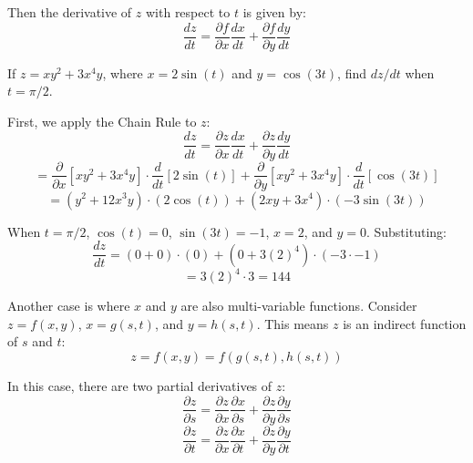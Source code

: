 Then the derivative of $z$ with respect to $t$ is given by:
$$\frac{dz}{dt} = \frac{\partial f}{\partial x} \frac{dx}{dt} + \frac{
\partial f}{\partial y} \frac{dy}{dt}$$

\begin{Worked}
\begin{Problem}
If $z = xy^2 + 3x^4y$, where $x = 2\sin{\left( t \right)}$ 
and $y = \cos{ \left(3t \right)}$, find $dz/dt$ when $t = \pi/2$. 
\end{Problem}
\begin{Solution}
First, we apply the Chain Rule to $z$:
$$\frac{dz}{dt} = \frac{\partial z}{\partial x} \frac{dx}{dt} + \frac{\partial 
z}{\partial y} \frac{dy}{dt}$$
$$= \frac{\partial}{\partial x} \left[ xy^2 + 3x^4y \right] \cdot \frac{d}{dt} 
\left[ 2\sin{ \left( t \right)} \right] + \frac{\partial}{\partial y} \left[ 
xy^2 + 3x^4y \right] \cdot \frac{d}{dt} \left[ \cos{ \left( 3t \right)} 
\right]$$
$$= \left( y^2 + 12x^3y \right) \cdot \left( 2\cos{ \left( t \right)} \right) 
+ \left( 2xy + 3x^4 \right) \cdot \left( -3\sin{ \left( 3t \right) } \right)$$

When $t = \pi/2$, $\cos{\left( t \right)} = 0$, $\sin{ \left( 3t \right)} = 
-1$, $x = 2$, and $y = 0$. Substituting:
$$\frac{dz}{dt} = \left( 0 + 0 \right) \cdot \left( 0 \right) + \left( 0 + 
3(2)^4 \right) \cdot \left( -3 \cdot -1 \right)$$
$$= 3(2)^4 \cdot 3 = 144$$
\end{Solution}
\end{Worked}

Another case is where $x$ and $y$ are also multi-variable functions. Consider 
$z = f(x, y)$, $x = g(s, t)$, and $y = h(s, t)$. This means $z$ is an indirect 
function of $s$ and $t$:
$$z = f(x, y) = f \left( g(s, t), h(s, t) \right)$$

In this case, there are two partial derivatives of $z$:
$$\frac{\partial z}{\partial s} = \frac{\partial z}{\partial x} \frac{\partial 
x}{\partial s} + \frac{\partial z}{\partial y} \frac{\partial y}{\partial s}$$
$$\frac{\partial z}{\partial t} = \frac{\partial z}{\partial x} \frac{\partial 
x}{\partial t} + \frac{\partial z}{\partial y} \frac{\partial y}{\partial t}$$

